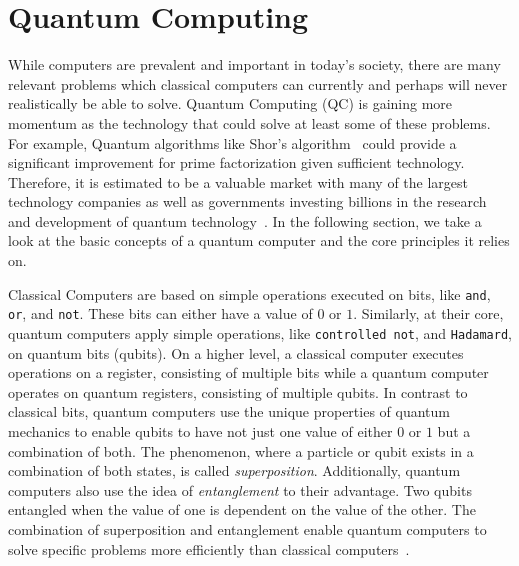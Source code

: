 \section{Quantum Computing}
\label{sec:background_quantumComputing}
While computers are prevalent and important in today's society, there are many relevant problems which classical computers can currently and perhaps will never realistically be able to solve. Quantum Computing (QC) is gaining more momentum as the technology that could solve at least some of these problems. For example, Quantum algorithms like Shor's algorithm~\cite{Shor97} could provide a significant improvement for prime factorization given sufficient technology. Therefore, it is estimated to be a valuable market with many of the largest technology companies as well as governments investing billions in the research and development of quantum technology~\cite{RDB*22, Pres18}. 
In the following section, we take a look at the basic concepts of a quantum computer and the core principles it relies on.

Classical Computers are based on simple operations executed on bits, like \texttt{and}, \texttt{or}, and \texttt{not}. These bits can either have a value of $0$ or $1$. Similarly, at their core, quantum computers apply simple operations, like \texttt{controlled not}, and \texttt{Hadamard}, on quantum bits (qubits). 
On a higher level, a classical computer executes operations on a register, consisting of multiple bits while a quantum computer operates on quantum registers, consisting of multiple qubits.
In contrast to classical bits, quantum computers use the unique properties of quantum mechanics to enable qubits to have not just one value of either $0$ or $1$ but a combination of both. The phenomenon, where a particle or qubit exists in a combination of both states, is called \emph{superposition}. Additionally, quantum computers also use the idea of \emph{entanglement} to their advantage. Two qubits entangled when the value of one is dependent on the value of the other. The combination of superposition and entanglement enable quantum computers to solve specific problems more efficiently than classical computers~\cite{RDB*22}.

